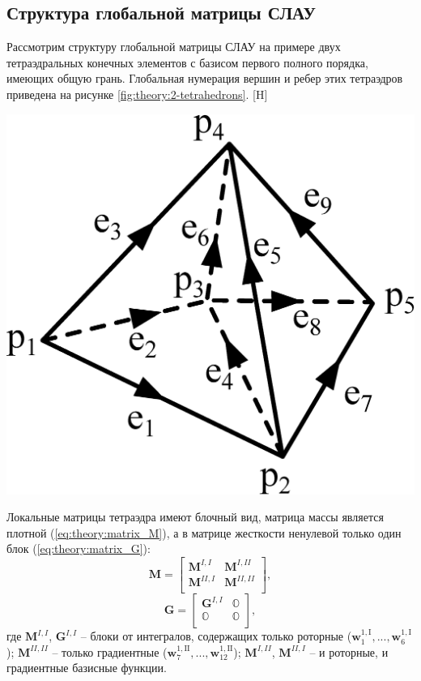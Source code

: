 \documentclass[a4paper,14pt]{article}
\makeatletter
\renewenvironment{figure}[1][\fps@figure]{
  \edef\@tempa{\noexpand\@float{figure}[#1]}
  \@tempa
  \addtocounter{foofigure}{1}
}{
  \end@float
}
\makeatother
\begin{document}
\subsection{Структура глобальной матрицы СЛАУ}
Рассмотрим структуру глобальной матрицы СЛАУ на примере двух тетраэдральных конечных элементов с базисом первого полного порядка, имеющих общую грань. Глобальная нумерация вершин и ребер этих тетраэдров приведена на рисунке \ref{fig:theory:2-tetrahedrons}.
\begin{figure}[H]
	\centering
	\includegraphics[scale=0.25]{theory/2-tetrahedrons.eps}
	\caption{два тетраэдральных конечных элемента}
	\label{fig:theory:2-tetrahedrons}
\end{figure}

Локальные матрицы тетраэдра имеют блочный вид, матрица массы является плотной (\ref{eq:theory:matrix_M}), а в матрице жесткости ненулевой только один блок (\ref{eq:theory:matrix_G}):
\begin{equation}
	\mathbf{M} = \left[
	\begin{matrix}
		\mathbf{M}^{I, I} & \mathbf{M}^{I, II} \\
		\mathbf{M}^{II, I} & \mathbf{M}^{II, II} \\
	\end{matrix}
	\right] , \label{eq:theory:matrix_M}
\end{equation}
\begin{equation}
	\mathbf{G} = \left[
	\begin{matrix}
		\mathbf{G}^{I, I} & \mathbb{O} \\
		\mathbb{O} &  \mathbb{O} \\
	\end{matrix}
	\right] , \label{eq:theory:matrix_G}
\end{equation}
где $\mathbf{M}^{I, I}$, $\mathbf{G}^{I, I}$ -- блоки от интегралов, содержащих только роторные ($\mathbf{w}_{1}^{1,\mathrm{I}}, ..., \mathbf{w}_{6}^{1,\mathrm{I}}$); $\mathbf{M}^{II, II}$ -- только градиентные ($\mathbf{w}_{7}^{1,\mathrm{II}}, ..., \mathbf{w}_{12}^{1,\mathrm{II}}$); $\mathbf{M}^{I, II}$, $\mathbf{M}^{II, I}$ -- и роторные, и градиентные базисные функции.
\end{document}
